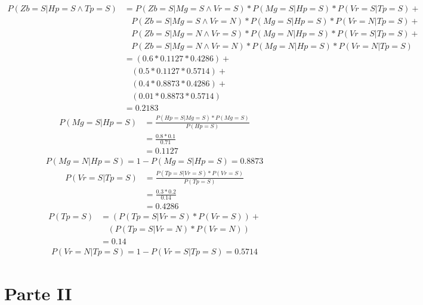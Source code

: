 \documentclass[answers]{exam}
\begin{document}
\begin{questions}
\question
\begin{solution}
\begin{align*}
P(Zb=S|Hp=S \land Tp=S) &= P(Zb=S|Mg=S \land Vr=S)*P(Mg=S|Hp=S)*P(Vr=S|Tp=S)+\\
                        &\ \ \ \ P(Zb=S|Mg=S \land Vr=N)*P(Mg=S|Hp=S)*P(Vr=N|Tp=S)+\\
                        &\ \ \ \ P(Zb=S|Mg=N \land Vr=S)*P(Mg=N|Hp=S)*P(Vr=S|Tp=S)+\\
                        &\ \ \ \ P(Zb=S|Mg=N \land Vr=N)*P(Mg=N|Hp=S)*P(Vr=N|Tp=S)\\
                        &= (0.6*0.1127*0.4286)+\\
                        &\ \ \ \ (0.5*0.1127*0.5714)+\\
                        &\ \ \ \ (0.4*0.8873*0.4286)+\\  
                        &\ \ \ \ (0.01*0.8873*0.5714)\\  
                        &=0.2183   
\end{align*}
\begin{align*}
P(Mg=S|Hp=S) &= \frac{P(Hp=S|Mg=S)*P(Mg=S)}{P(Hp=S)}\\
             &= \frac{0.8*0.1}{0.71}\\
             &= 0.1127
\end{align*}
\begin{align*}
P(Mg=N|Hp=S) = 1 - P(Mg=S|Hp=S) = 0.8873
\end{align*}
\begin{align*}
P(Vr=S|Tp=S) &= \frac{P(Tp=S|Vr=S)*P(Vr=S)}{P(Tp=S)}\\
             &= \frac{0.3*0.2}{0.14}\\
             &= 0.4286
\end{align*}
\begin{align*}
P(Tp=S) &=(P(Tp=S|Vr=S)*P(Vr=S)) +\\
        &\ \ \ \ (P(Tp=S|Vr=N)*P(Vr=N))\\
        &= 0.14
\end{align*}
\begin{align*}
P(Vr=N|Tp=S) = 1 - P(Vr=S|Tp=S) = 0.5714
\end{align*}
\end{solution}
\end{questions}

\pagebreak
\section{Parte II}
 
\end{document}
